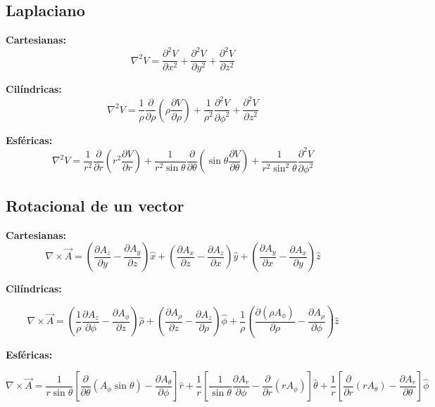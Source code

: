 \documentclass[11pt]{article}
\begin{document}
\subsection{Laplaciano}

\textbf{Cartesianas:}
\begin{equation}
    \nabla^2 V = \frac{\partial^2 V}{\partial x^2} + \frac{\partial^2 V}{\partial y^2} + \frac{\partial^2 V}{\partial z^2}
\end{equation}

\textbf{Cilíndricas:}
\begin{equation}
    \nabla^2 V = \frac{1}{\rho} \frac{\partial}{\partial \rho} \left( \rho \frac{\partial V}{\partial \rho} \right) + \frac{1}{\rho^2} \frac{\partial^2 V}{\partial \phi^2} + \frac{\partial^2 V}{\partial z^2}
\end{equation}

\textbf{Esféricas:}
\begin{equation}
    \nabla^2 V = \frac{1}{r^2} \frac{\partial}{\partial r} \left( r^2 \frac{\partial V}{\partial r} \right) + \frac{1}{r^2 \sin \theta} \frac{\partial}{\partial \theta} \left( \sin \theta \frac{\partial V}{\partial \theta} \right) + \frac{1}{r^2 \sin^2 \theta} \frac{\partial^2 V}{\partial \phi^2}
\end{equation}

\subsection{Rotacional de un vector}

\textbf{Cartesianas:}
\[
\nabla \times \vec{A} =
\left( \frac{\partial A_z}{\partial y} - \frac{\partial A_y}{\partial z} \right) \hat{x}
+ \left( \frac{\partial A_x}{\partial z} - \frac{\partial A_z}{\partial x} \right) \hat{y}
+ \left( \frac{\partial A_y}{\partial x} - \frac{\partial A_x}{\partial y} \right) \hat{z}
\]


\textbf{Cilíndricas:}

\[
\nabla \times \vec{A} =
\left( \frac{1}{\rho} \frac{\partial A_z}{\partial \phi} - \frac{\partial A_\phi}{\partial z} \right) \hat{\rho}
+ \left( \frac{\partial A_\rho}{\partial z} - \frac{\partial A_z}{\partial \rho} \right) \hat{\phi}
+ \frac{1}{\rho} \left( \frac{\partial (\rho A_\phi)}{\partial \rho} - \frac{\partial A_\rho}{\partial \phi} \right) \hat{z}
\]



\textbf{Esféricas:}

\[
\nabla \times \vec{A} =
\frac{1}{r \sin\theta}
\left[
\frac{\partial}{\partial \theta} (A_\phi \sin\theta) - \frac{\partial A_\theta}{\partial \phi}
\right] \hat{r}
+ \frac{1}{r}
\left[
\frac{1}{\sin\theta} \frac{\partial A_r}{\partial \phi} - \frac{\partial}{\partial r}(r A_\phi)
\right] \hat{\theta}
+ \frac{1}{r}
\left[
\frac{\partial}{\partial r}(r A_\theta) - \frac{\partial A_r}{\partial \theta}
\right] \hat{\phi}
\]
\end{document}
